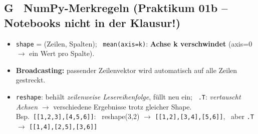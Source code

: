 \documentclass[10pt,a4paper]{article}
\begin{document}
\subsection*{G \ NumPy-Merkregeln (Praktikum 01b -- Notebooks nicht in der Klausur!)}
\begin{itemize}
  \item \texttt{shape} = (Zeilen, Spalten); \ \texttt{mean(axis=k)}: \textbf{Achse k verschwindet} (axis=0 $\to$ ein Wert pro Spalte).
  \item \textbf{Broadcasting:} passender Zeilenvektor wird automatisch auf alle Zeilen gestreckt.
  \item \texttt{reshape}: behält \emph{zeilenweise Lesereihenfolge}, füllt neu ein; \ \texttt{.T}: \emph{vertauscht Achsen} $\to$ verschiedene Ergebnisse trotz gleicher Shape.\\
  Bsp.\ \texttt{[[1,2,3],[4,5,6]]}: \ reshape(3,2) $\to$ \texttt{[[1,2],[3,4],[5,6]]}, \ aber \texttt{.T} $\to$ \texttt{[[1,4],[2,5],[3,6]]}
\end{itemize}
\end{document}

